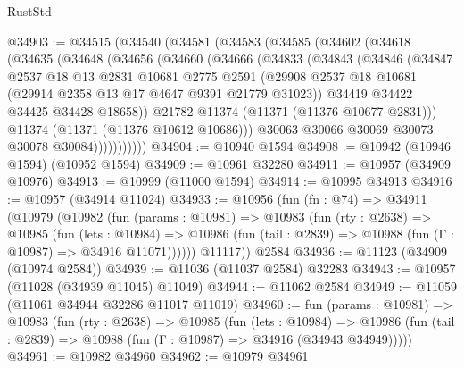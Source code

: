 \begin{lexlean}{RustStd}
\begin{coremodule}
@34903 := @34515
    (@34540
      (@34581
        (@34583
          (@34585
            (@34602
              (@34618
                (@34635
                  (@34648
                    (@34656
                      (@34660
                        (@34666
                          (@34833
                            (@34843
                              (@34846
                                (@34847
                                  @2537
                                  @18
                                  @13
                                  @2831
                                  @10681
                                  @2775
                                  @2591
                                  (@29908
                                    @2537
                                    @18
                                    @10681
                                    (@29914 @2358 @13 @17 @4647 @9391 @21779 @31023))
                                  @34419
                                  @34422
                                  @34425
                                  @34428
                                  @18658))
                              @21782
                              @11374
                              (@11371 (@11376 @10677 @2831)))
                            @11374
                            (@11371 (@11376 @10612 @10686)))
                          @30063
                          @30066
                          @30069
                          @30073
                          @30078
                          @30084)))))))))))
@34904 := @10940 @1594
@34908 := @10942 (@10946 @1594) (@10952 @1594)
@34909 := @10961 @32280
@34911 := @10957 (@34909 @10976)
@34913 := @10999 (@11000 @1594)
@34914 := @10995 @34913
@34916 := @10957 (@34914 @11024)
@34933 := @10956
    (fun (fn : @74) =>
    @34911
      (@10979
        (@10982
          (fun (params : @10981) =>
          @10983
            (fun (rty : @2638) =>
            @10985
              (fun (lets : @10984) =>
              @10986 (fun (tail : @2839) => @10988 (fun (Γ : @10987) => @34916 @11071))))))
        @11117))
    @2584
@34936 := @11123 (@34909 (@10974 @2584))
@34939 := @11036 (@11037 @2584) @32283
@34943 := @10957 (@11028 (@34939 @11045) @11049)
@34944 := @11062 @2584
@34949 := @11059 (@11061 @34944 @32286 @11017 @11019)
@34960 := fun (params : @10981) =>
  @10983
    (fun (rty : @2638) =>
    @10985
      (fun (lets : @10984) =>
      @10986 (fun (tail : @2839) => @10988 (fun (Γ : @10987) => @34916 (@34943 @34949)))))
@34961 := @10982 @34960
@34962 := @10979 @34961

\end{coremodule}
\end{lexlean}
